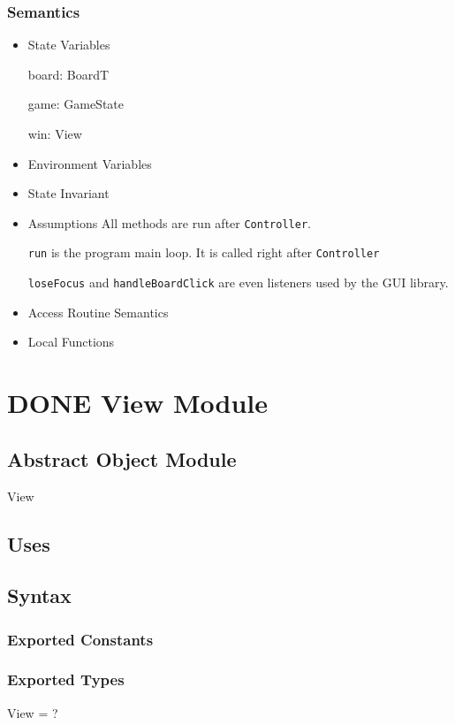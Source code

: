 \documentclass[11pt]{article}
\begin{document}
\subsubsection*{Semantics}
\label{sec:org6be9d7d}
\begin{itemize}
\item State Variables
\label{sec:org5763db9}

board: BoardT

game: GameState

win: View

\item Environment Variables
\label{sec:org05fdf43}
\item State Invariant
\label{sec:org92e7080}
\item Assumptions
\label{sec:orgf9e48c6}
All methods are run after \texttt{Controller}.

\texttt{run} is the program main loop. It is called right after \texttt{Controller}

\texttt{loseFocus} and \texttt{handleBoardClick} are even listeners used by the GUI library.

\item Access Routine Semantics
\label{sec:org9417ccd}
\item Local Functions
\label{sec:org7553822}


\newpage
\end{itemize}
\section{{\bfseries\sffamily DONE} View Module}
\label{sec:orgb0b0b9f}
\subsection*{Abstract Object Module}
\label{sec:org7426852}
View
\subsection*{Uses}
\label{sec:org0db6d8c}

\subsection*{Syntax}
\label{sec:orgfc61455}
\subsubsection*{Exported Constants}
\label{sec:org9e91b38}
\subsubsection*{Exported Types}
\label{sec:org292bb46}
View = ?
\end{document}
